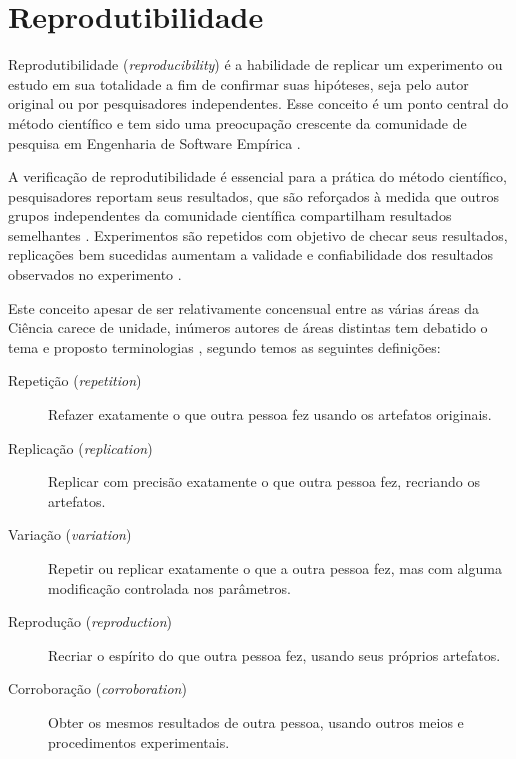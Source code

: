 \section{Reprodutibilidade}
\label{sec:reprodutibilidade}

Reprodutibilidade ({\it reproducibility}) é a habilidade de replicar um
experimento ou estudo em sua totalidade a fim de confirmar suas hipóteses, seja
pelo autor original ou por pesquisadores independentes. Esse conceito é um
ponto central do método científico e tem sido uma preocupação crescente da
comunidade de pesquisa em Engenharia de Software Empírica
\cite{gonzalez_reproducibility_2012}.

A verificação de reprodutibilidade é essencial para a prática do método
científico, pesquisadores reportam seus resultados, que são reforçados à medida
que outros grupos independentes da comunidade científica compartilham
resultados semelhantes \cite{mccormick_itk_2014}. Experimentos são repetidos
com objetivo de checar seus resultados, replicações bem sucedidas aumentam a
validade e confiabilidade dos resultados observados no experimento
\cite{almqvist_replication_2006,juristo_replication_2012}.

Este conceito apesar de ser relativamente concensual entre as várias áreas da
Ciência carece de unidade, inúmeros autores de áreas distintas tem debatido o
tema e proposto terminologias \cite{drummond_replicability_2009,
vitek_repeatability_2011, mendoza_defining_2017, plesser_reproducibility_2018},
segundo  temos as seguintes
definições:

\begin{description}

  \item[Repetição ({\it repetition})]
  Refazer exatamente o que outra pessoa fez usando os artefatos originais.

  \item[Replicação ({\it replication})]
  Replicar com precisão exatamente o que outra pessoa fez, recriando os
  artefatos.

  \item[Variação ({\it variation})]
  Repetir ou replicar exatamente o que a outra pessoa fez, mas com alguma
  modificação controlada nos parâmetros.

  \item[Reprodução ({\it reproduction})]
  Recriar o espírito do que outra pessoa fez, usando seus próprios artefatos.

  \item[Corroboração ({\it corroboration})]
  Obter os mesmos resultados de outra pessoa, usando outros meios e
  procedimentos experimentais.

\end{description}

